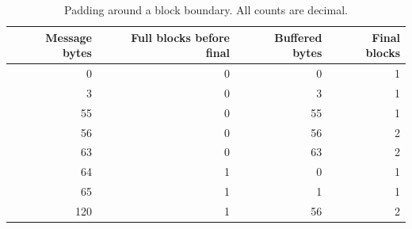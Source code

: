 \begin{table}[htbp]
\centering\caption{Padding around a block boundary. All counts are decimal.}
\begin{tabular}{rrrr}
\toprule
Message bytes & Full blocks before final & Buffered bytes & Final blocks\\
\midrule
0 & 0 & 0 & 1\\
3 & 0 & 3 & 1\\
55 & 0 & 55 & 1\\
56 & 0 & 56 & 2\\
63 & 0 & 63 & 2\\
64 & 1 & 0 & 1\\
65 & 1 & 1 & 1\\
120 & 1 & 56 & 2\\
\bottomrule
\end{tabular}
\end{table}
